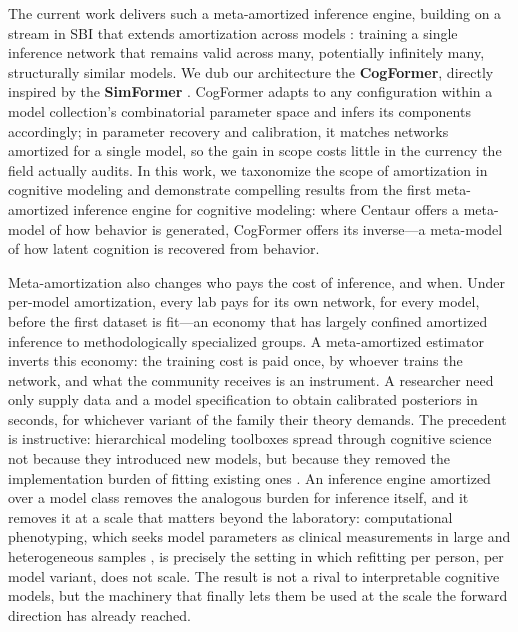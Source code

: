 The current work delivers such a meta-amortized inference engine, building on a stream in SBI that extends amortization across models \citep{chang2025amortized, gloeckler2024all, elsemuller2023sensitivity, schroder2023simultaneous}:
training a single inference network that remains valid across many, potentially infinitely many, structurally similar models.
We dub our architecture the \textbf{CogFormer}, directly inspired by the \textbf{SimFormer} \citep{gloeckler2024all}.
CogFormer adapts to any configuration within a model collection's combinatorial parameter space and infers its components accordingly; in parameter recovery and calibration, it matches networks amortized for a single model, so the gain in scope costs little in the currency the field actually audits.
In this work, we taxonomize the scope of amortization in cognitive modeling and demonstrate compelling results from the first meta-amortized inference engine for cognitive modeling: where Centaur offers a meta-model of how behavior is generated, CogFormer offers its inverse---a meta-model of how latent cognition is recovered from behavior.

Meta-amortization also changes who pays the cost of inference, and when.
Under per-model amortization, every lab pays for its own network, for every model, before the first dataset is fit---an economy that has largely confined amortized inference to methodologically specialized groups.
A meta-amortized estimator inverts this economy: the training cost is paid once, by whoever trains the network, and what the community receives is an instrument.
A researcher need only supply data and a model specification to obtain calibrated posteriors in seconds, for whichever variant of the family their theory demands.
The precedent is instructive: hierarchical modeling toolboxes spread through cognitive science not because they introduced new models, but because they removed the implementation burden of fitting existing ones \citep{PLACEHOLDER-hddm-emc2-toolboxes}.
An inference engine amortized over a model class removes the analogous burden for inference itself, and it removes it at a scale that matters beyond the laboratory: computational phenotyping, which seeks model parameters as clinical measurements in large and heterogeneous samples \citep{PLACEHOLDER-huys-phenotyping}, is precisely the setting in which refitting per person, per model variant, does not scale.
The result is not a rival to interpretable cognitive models, but the machinery that finally lets them be used at the scale the forward direction has already reached.

